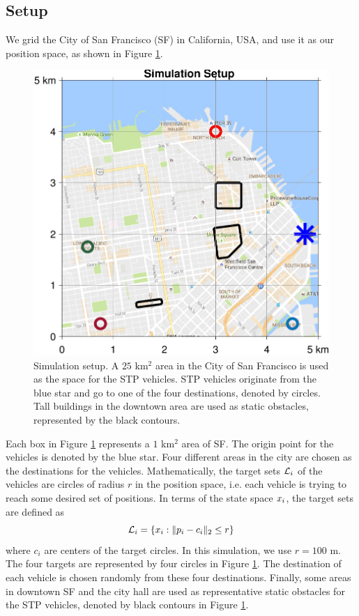 \subsection{Setup \label{sec:city_simSetup}}
We grid the City of San Francisco (SF) in California, USA, and use it as our position space, as shown in Figure \ref{fig:sf_setup}. 
\begin{figure}
  \centering
  \includegraphics[width=\columnwidth]{figs/sf_setup}
  \caption{Simulation setup. A $25$ km$^2$ area in the City of San Francisco is used as the space for the STP vehicles. STP vehicles originate from the blue star and go to one of the four destinations, denoted by circles. Tall buildings in the downtown area are used as static obstacles, represented by the black contours.}
  \label{fig:sf_setup}
\end{figure}
Each box in Figure \ref{fig:sf_setup} represents a $1$ km$^2$ area of SF. The origin point for the vehicles is denoted by the blue star. Four different areas in the city are chosen as the destinations for the vehicles. Mathematically, the target sets $\mathcal{L}_i$ of the vehicles are circles of radius $r$ in the position space, i.e. each vehicle is trying to reach some desired set of positions. In terms of the state space $x_i$, the target sets are defined as
\begin{equation}
\label{eq:target_sim}
\mathcal{L}_i = \{x_i: \|p_i - c_i\|_2 \le r\}
\end{equation}
\noindent where $c_i$ are centers of the target circles. In this simulation, we use $r = 100$ m. The four targets are represented by four circles in Figure \ref{fig:sf_setup}. The destination of each vehicle is chosen randomly from these four destinations. Finally, some areas in downtown SF and the city hall are used as representative static obstacles for the STP vehicles, denoted by black contours in Figure \ref{fig:sf_setup}.

